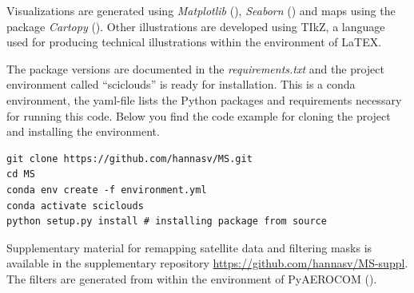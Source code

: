 Visualizations are generated using \textit{Matplotlib} (\cite{matplotlib}), \textit{Seaborn} (\cite{seaborn}) and maps using the package \textit{Cartopy} (\cite{Cartopy}). Other illustrations are developed using TIkZ, a language used for producing technical illustrations within the environment of LaTEX.

The package versions are documented in the \textit{requirements.txt} and the project environment called ``sciclouds'' is ready for installation. This is a conda environment, the yaml-file lists the Python packages and requirements necessary for running this code. Below you find the code example for cloning the project and installing the environment.

\begin{verbatim}
git clone https://github.com/hannasv/MS.git
cd MS
conda env create -f environment.yml
conda activate sciclouds
python setup.py install # installing package from source
\end{verbatim}

Supplementary material for remapping satellite data and filtering masks is available in the supplementary repository \href{https://github.com/hannasv/MS-suppl}{https://github.com/hannasv/MS-suppl}. %
The filters are generated from within the environment of PyAEROCOM (\cite{pyaerocom}). 



